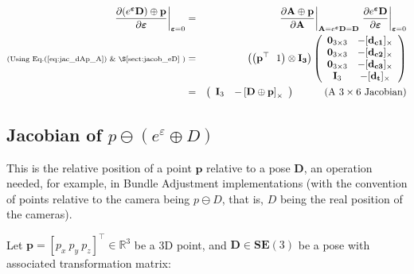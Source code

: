 \documentclass[a4paper,11pt]{report}
\newcommand{\E}{{\bm{\varepsilon}}}
\begin{document}
\begin{eqnarray}
\left. \frac{\partial (e^\E \mathbf{D}) \oplus \mathbf{p} }{\partial \E} \right|_{\E = 0}
&=& 
\left. \frac{\partial \mathbf{A} \oplus \mathbf{p}}{\partial \mathbf{A} } \right|_{\mathbf{A}=e^\E \mathbf{D} = \mathbf{D}}
\left. \frac{\partial e^\E \mathbf{D}}{\partial \E} \right|_{\E=0}
\\
\text{\scriptsize{(Using Eq.(\ref{eq:jac_dAp_A}) \& \S\ref{sect:jacob_eD}} )} &=&
\left(\left( \mathbf{p}^\top ~~ 1 \right) \otimes \mathbf{I_3} \right)
\left(
\begin{array}{cc}
 \mathbf{0}_{3\times 3}  & -[\mathbf{d_{c1}}]_\times \\
 \mathbf{0}_{3\times 3}  & -[\mathbf{d_{c2}}]_\times \\
 \mathbf{0}_{3\times 3}  & -[\mathbf{d_{c3}}]_\times \\
 \mathbf{I}_{3}  & -[\mathbf{d_{t}}]_\times \\
\end{array}
\right)
\\
\label{eq:jacob_eDp_e}
&=& 
\left(
\begin{array}{cc}
 \mathbf{I}_3   & - \left[ \mathbf{D} \oplus \mathbf{p} \right]_\times
\end{array}
\right)
\quad\quad\quad \text{(A $3 \times 6$ Jacobian)}
\end{eqnarray}



\subsection{Jacobian of $p \ominus (e^\varepsilon \oplus D) $}
\label{sect:jacob_eDp_inv}

This is the relative position of a point $\mathbf{p}$ relative to a pose $\mathbf{D}$, 
an operation needed, for example, in Bundle Adjustment implementations \cite{triggs2000bundle}
(with the convention of points relative to the camera being $p \ominus D$, that is, 
$D$ being the real position of the cameras).

Let $\mathbf{p} = [p_x ~ p_y ~ p_z]^\top \in \mathbb{R}^3$ be a 3D point, and 
$\mathbf{D} \in \mathbf{SE}(3)$ be a pose with associated transformation matrix:
\end{document}
